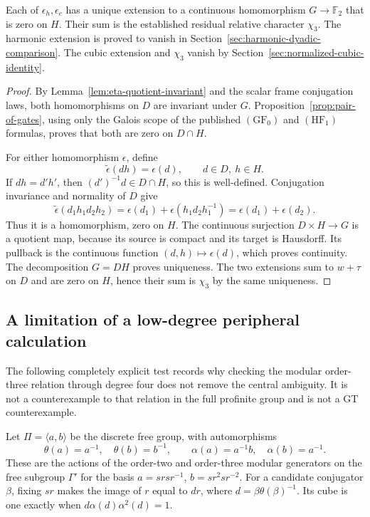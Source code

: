 \begin{proposition}\label{prop:two-relative-extensions}
Each of $\epsilon_h,\epsilon_c$ has a unique extension to a
continuous homomorphism $G\to\mathbb F_2$ that is zero on $H$.
Their sum is the established residual relative character $\chi_3$.
The harmonic extension is proved to vanish in
Section~\ref{sec:harmonic-dyadic-comparison}. The cubic extension
and $\chi_3$ vanish by Section~\ref{sec:normalized-cubic-identity}.
\end{proposition}
\begin{proof}
By Lemma~\ref{lem:eta-quotient-invariant} and the scalar frame
conjugation laws, both homomorphisms on $D$ are invariant under
$G$.  Proposition~\ref{prop:pair-of-gates}, using only the Galois
scope of the published $(\mathrm{GF}_0)$ and $(\mathrm{HF}_1)$
formulas, proves that both are zero on $D\cap H$.

For either homomorphism $\epsilon$, define
\[
 \widetilde\epsilon(dh)=\epsilon(d),\qquad d\in D,\ h\in H.
\]
If $dh=d'h'$, then $(d')^{-1}d\in D\cap H$, so this is
well-defined.  Conjugation invariance and normality of $D$ give
\[
 \widetilde\epsilon(d_1h_1d_2h_2)
 =\epsilon(d_1)+\epsilon(h_1d_2h_1^{-1})
 =\epsilon(d_1)+\epsilon(d_2).
\]
Thus it is a homomorphism, zero on $H$.
The continuous surjection $D\times H\to G$ is a quotient map,
because its source is compact and its target is Hausdorff.
Its pullback is the continuous function $(d,h)\mapsto\epsilon(d)$,
which proves continuity.  The decomposition $G=DH$ proves
uniqueness.  The two extensions sum to $w+\tau$ on $D$ and
are zero on $H$, hence their sum is $\chi_3$ by the same uniqueness.
\end{proof}

\subsection{A limitation of a low-degree peripheral calculation}

The following completely explicit test records why checking the
modular order-three relation through degree four does not remove
the central ambiguity.  It is not a counterexample to that relation
in the full profinite group and is not a GT counterexample.

Let $\Pi=\langle a,b\rangle$ be the discrete free group, with
automorphisms
\[
 \theta(a)=a^{-1},\quad\theta(b)=b^{-1},\qquad
 \alpha(a)=a^{-1}b,\quad\alpha(b)=a^{-1}.
\]
These are the actions of the order-two and order-three modular
generators on the free subgroup $\Gamma'$ for the basis
$a=srsr^{-1}$, $b=sr^2sr^{-2}$.
For a candidate conjugator $\beta$, fixing $sr$ makes the
image of $r$ equal to $dr$, where
$d=\beta\theta(\beta)^{-1}$.  Its cube is one exactly when
$d\alpha(d)\alpha^2(d)=1$.

